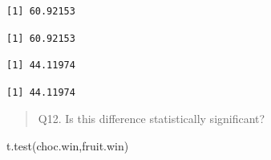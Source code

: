 \documentclass[
  letterpaper,
  DIV=11,
  numbers=noendperiod]{scrartcl}
\newenvironment{Shaded}{\begin{snugshade}}{\end{snugshade}}
\newcommand{\DecValTok}[1]{\textcolor[rgb]{0.68,0.00,0.00}{#1}}
\newcommand{\FunctionTok}[1]{\textcolor[rgb]{0.28,0.35,0.67}{#1}}
\newcommand{\NormalTok}[1]{\textcolor[rgb]{0.00,0.23,0.31}{#1}}
\newcommand{\OtherTok}[1]{\textcolor[rgb]{0.00,0.23,0.31}{#1}}
\newcommand{\SpecialCharTok}[1]{\textcolor[rgb]{0.37,0.37,0.37}{#1}}
\begin{document}
\begin{verbatim}
[1] 60.92153
\end{verbatim}

\begin{Shaded}
\end{Shaded}

\begin{verbatim}
[1] 60.92153
\end{verbatim}

\begin{Shaded}
\end{Shaded}

\begin{verbatim}
[1] 44.11974
\end{verbatim}

\begin{Shaded}
\end{Shaded}

\begin{verbatim}
[1] 44.11974
\end{verbatim}

\begin{quote}
Q12. Is this difference statistically significant?
\end{quote}

\begin{Shaded}
\begin{Highlighting}[]
\FunctionTok{t.test}\NormalTok{(choc.win,fruit.win)}
\end{Highlighting}
\end{Shaded}
\end{document}
